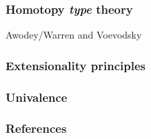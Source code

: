 \documentclass[handout]{beamer} %
\begin{document}
\begin{frame}
  \frametitle{Homotopy \emph{type} theory}
  
  Awodey/Warren and Voevodsky
\end{frame}

\begin{frame}
  \frametitle{Extensionality principles}
  
\end{frame}

\begin{frame}
  \frametitle{Univalence}
  
\end{frame}

\begin{frame}
  \frametitle{References}
  
  
  \nocite{hott_2013}
  \nocite{awodey_2012}
  \nocite{shulman_2017}
\end{frame}
\end{document}
